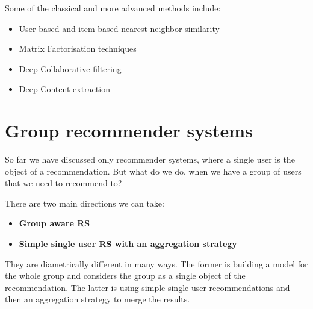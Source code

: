 Some of the classical and more advanced methods include:
\begin{itemize}
    \item User-based and item-based nearest neighbor similarity \cite{hill1995recommending}\cite{shardanand1995social}\cite{balabanovic1997fab}
    \item Matrix Factorisation techniques\cite{koren2009matrix}
    \item Deep Collaborative filtering \cite{he2017neural}\cite{covington2016deep}
    \item Deep Content extraction
\end{itemize}

\section{Group recommender systems} \label{section01.1}
So far we have discussed only recommender systems, where a single user is the object of a recommendation. But what do we do, when we have a group of users that we need to recommend to?

There are two main directions we can take:
\begin{itemize}
    \item \textbf{Group aware RS}
    \item \textbf{Simple single user RS with an aggregation strategy}
\end{itemize}

They are diametrically different in many ways. The former is building a model for the whole group and considers the group as a single object of the recommendation. The latter is using simple single user recommendations and then an aggregation strategy to merge the results.